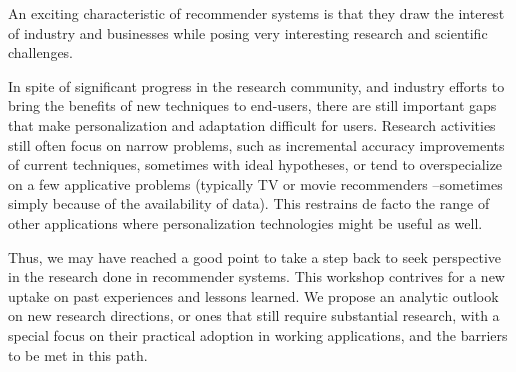  An exciting characteristic of recommender systems is that they draw the interest of industry and businesses while posing very interesting research and scientific challenges.

 In spite of significant progress in the research community, and industry efforts to bring the benefits of new techniques to end-users, there are still important gaps that make personalization and adaptation difficult for users. Research activities still often focus on narrow problems, such as incremental accuracy improvements of current techniques, sometimes with ideal hypotheses, or tend to overspecialize on a few applicative problems (typically TV or movie recommenders –sometimes simply because of the availability of data). This restrains de facto the range of other applications where personalization technologies might be useful as well.

 Thus, we may have reached a good point to take a step back to seek perspective in the research done in recommender systems. This workshop contrives for a new uptake on past experiences and lessons learned. We propose an analytic outlook on new research directions, or ones that still require substantial research, with a special focus on their practical adoption in working applications, and the barriers to be met in this path.






